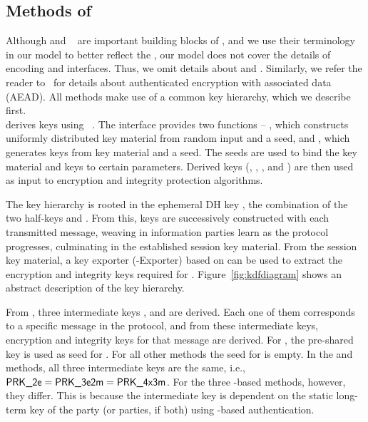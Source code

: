 \subsection{Methods of \mEdhoc{}}
\label{sec:methods}
Although \mCbor{} and \mCose{}~\cite{rfc8152} are important building blocks of
\mEdhoc{}, and we use their terminology in our \mTamarin{} model to better
reflect the \mSpec{}, our model does not cover the details of encoding and
\mCose{} interfaces.
%
Thus, we omit details about \mCbor{} and \mCose{}. Similarly, we refer the reader to~\cite{aead} for details about authenticated encryption with associated data (AEAD).
%
All methods make use of a common key hierarchy, which we describe first.
%
\\

\label{sec:keyHierarchy}
\mEdhoc{} derives keys using \mHkdf{}~\cite{rfc5869}.
%
The \mHkdf{} interface provides two functions -- \mHkdfExtract{}, which
constructs uniformly distributed key material from random input and a seed,
and \mHkdfExpand{}, which generates keys from key material and a seed.
%
The seeds are used to bind the key material and keys to certain parameters.
%
Derived keys (\mKtwoe, \mKtwom{}, \mKthreeae, and \mKthreem) are then used as
input to encryption and integrity protection algorithms.
%

The key hierarchy is rooted in the ephemeral DH key \mGxy{}, the combination
of the two half-keys \mGx{} and \mGy{}.
%
From this, keys are successively constructed with each transmitted message,
weaving in information parties learn as the protocol progresses, culminating
in the established session key material.
%
From the session key material, a key exporter (\mEdhoc-Exporter) based on
\mHkdf{} can be used to extract the encryption and integrity keys required
for \mOscore{}.
%
Figure~\ref{fig:kdfdiagram} shows an abstract description of the key hierarchy.
%

From \mGxy{}, three intermediate keys \mPRKtwo, \mPRKthree{} and
\mPRKthree{} are derived.
%
Each one of them corresponds to a specific message in the protocol, and from
these intermediate keys, encryption and integrity keys for that message are
derived.
%
For \mPskPsk{}, the pre-shared key is used as seed for \mPRKtwo.
%
For all other methods the seed for \mPRKtwo{} is empty.
%
In the \mPskPsk{} and \mSigSig{} methods, all three intermediate keys
are the same, i.e., $\textsf{PRK\_2e}{} = \textsf{PRK\_3e2m}{} = \textsf{PRK\_4x3m}$.
%
For the three \mStat-based methods, however, they differ.
%
This is because the intermediate key \mPRKthree{} is dependent on the static
long-term key of the party (or parties, if both) using \mStat{}-based
authentication.
%

